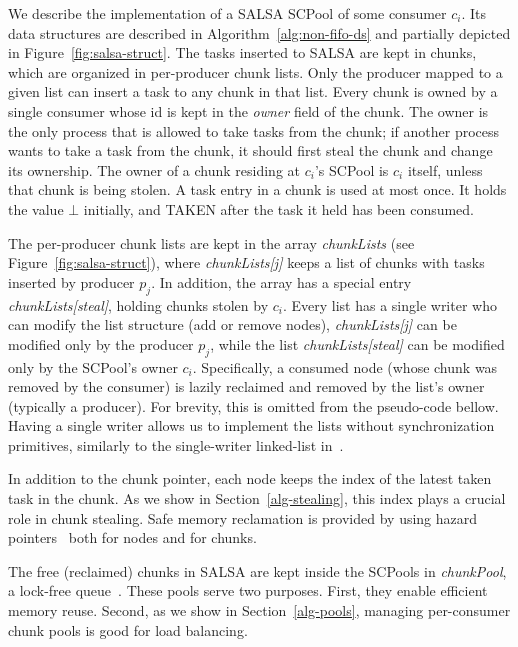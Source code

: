 We describe the implementation of a SALSA SCPool of some consumer $c_i$.
Its data structures are described in Algorithm~\ref{alg:non-fifo-ds} and partially depicted in Figure~\ref{fig:salsa-struct}. The tasks inserted to SALSA are kept in chunks, which are organized in per-producer chunk lists. Only the producer mapped to a given list can insert a task to any chunk in that list. Every chunk is owned by a single consumer whose id is kept in the \emph{owner} field of the chunk.
The owner is the only process that is allowed to take tasks from the chunk; if another process wants to take a task from the chunk, it should first steal the chunk and change its ownership. The owner of a chunk
residing at $c_i$'s SCPool is $c_i$ itself, unless that chunk is being stolen. A task entry in a chunk is used at most once. It holds the value $\bot$ initially, and TAKEN after the task it held has been consumed.

The per-producer chunk lists are kept in the array \emph{chunkLists} (see Figure~\ref{fig:salsa-struct}), where \emph{chunkLists[j]} keeps a list of chunks with tasks inserted by producer $p_j$. In addition, the array has a special entry \emph{chunkLists[steal]}, holding chunks stolen by $c_i$. Every list has a single writer who can modify the list structure (add or remove nodes), \emph{chunkLists[j]} can be modified only by the producer $p_j$, while the list \emph{chunkLists[steal]} can be modified only by the SCPool's owner $c_i$. Specifically, a consumed node (whose chunk was removed by the consumer) is lazily reclaimed and removed by the list's owner (typically a producer). For brevity, this is omitted from the pseudo-code bellow. Having a single writer allows us to implement the lists without synchronization primitives, similarly to the single-writer linked-list in~\cite{Michael:2004:HPS:987524.987595}.

In addition to the chunk pointer, each node keeps the index of the latest taken task in the chunk. As we show in Section~\ref{alg-stealing}, this index plays a crucial role in chunk stealing. Safe memory reclamation is provided by using hazard pointers~\cite{Michael:2004:HPS:987524.987595} both for nodes and for chunks.

The free (reclaimed) chunks in SALSA are kept inside the SCPools in \emph{chunkPool}, a lock-free queue~\cite{Michael:1996:SFP:248052.248106}. These pools serve two purposes. First, they enable efficient memory reuse. Second, as we show in Section~\ref{alg-pools}, managing per-consumer chunk pools is good for load balancing. 	
